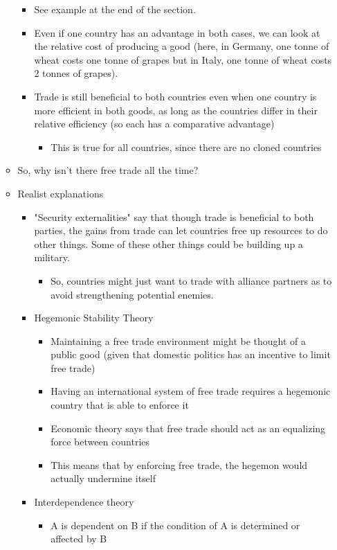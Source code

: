 \documentclass[11pt]{article}
\begin{document}
\begin{itemize}
\begin{itemize}
\begin{itemize}
\item See example at the end of the section.
\item Even if one country has an advantage in both cases, we can look at the
relative cost of producing a good (here, in Germany, one tonne of wheat
costs one tonne of grapes but in Italy, one tonne of wheat costs 2 tonnes
of grapes).
\item Trade is still beneficial to both countries even when one country is
more efficient in both goods, as long as the countries differ in their
relative efficiency (so each has a comparative advantage)
\begin{itemize}
\item This is true for all countries, since there are no cloned countries
\end{itemize}
\end{itemize}
\item So, why isn't there free trade all the time?
\item Realist explanations
\begin{itemize}
\item "Security externalities" say that though trade is beneficial to both
parties, the gains from trade can let countries free up resources to do
other things. Some of these other things could be building up a military.
\begin{itemize}
\item So, countries might just want to trade with alliance partners as to avoid
strengthening potential enemies.
\end{itemize}
\item Hegemonic Stability Theory
\begin{itemize}
\item Maintaining a free trade environment might be thought of a public
good (given that domestic politics has an incentive to limit free trade)
\item Having an international system of free trade requires a hegemonic
country that is able to enforce it
\item Economic theory says that free trade should act as an equalizing force
between countries
\item This means that by enforcing free trade, the hegemon would actually
undermine itself
\end{itemize}
\item Interdependence theory
\begin{itemize}
\item A is dependent on B if the condition of A is determined or affected by B

\end{itemize}
\end{itemize}
\end{itemize}
\end{itemize}
\end{document}
